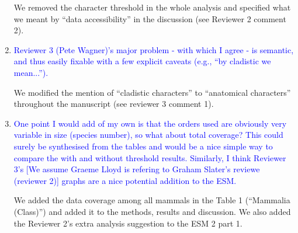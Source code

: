 \documentclass[12pt,letterpaper]{article}
\begin{document}
\begin{enumerate}
We removed the character threshold in the whole analysis and specified what we meant by ``data accessibility'' in the discussion (see Reviewer 2 comment 2).

\item{\textcolor{blue}{Reviewer 3 (Pete Wagner)'s major problem - with which I agree - is semantic, and thus easily fixable with a few explicit caveats (e.g., ``by cladistic we mean...'').}}

We modified the mention of ``cladistic characters'' to ``anatomical characters'' throughout the manuscript (see reviewer 3 comment 1).

\item{\textcolor{blue}{One point I would add of my own is that the orders used are obviously very variable in size (species number), so what about total coverage?
This could surely be synthesised from the tables and would be a nice simple way to compare the with and without threshold results.
Similarly, I think Reviewer 3's [We assume Graeme Lloyd is refering to Graham Slater's reviewe (reviewer 2)] %
 graphs are a nice potential addition to the ESM.}}

We added the data coverage among all mammals in the Table 1 (``Mammalia (Class)'') and added it to the methods, results and discussion.
We also added the Reviewer 2's extra analysis suggestion to the ESM 2 part 1.

\end{enumerate}
\end{document}
